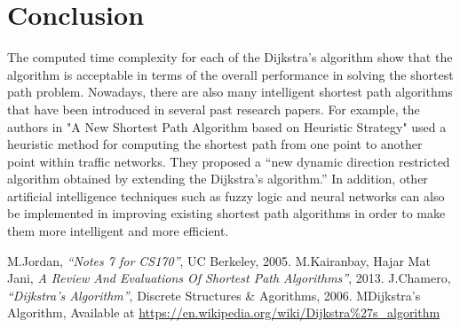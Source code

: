 \documentclass{article}
\begin{document}
\section{Conclusion}

The computed time complexity for each of the Dijkstra’s algorithm show that the algorithm is acceptable in terms of the overall performance in solving the shortest path problem. Nowadays, there are also many intelligent shortest path algorithms that have been introduced in several past research papers. For example, the authors in "A  New  Shortest Path Algorithm based on Heuristic Strategy" used a heuristic method for  computing the shortest path from one point to another point within traffic networks. They proposed a “new dynamic direction restricted algorithm obtained by extending the Dijkstra’s algorithm.” In addition, other artificial intelligence techniques such as fuzzy logic and neural networks can also be implemented in improving existing shortest path algorithms in order to make them more intelligent and more efficient.

\begin{thebibliography}{}

     M.Jordan, {\it “Notes 7 for CS170”}, UC Berkeley, 2005.
     M.Kairanbay, Hajar Mat Jani, {\it A Review And Evaluations Of Shortest Path Algorithms”}, 2013.
     J.Chamero, {\it “Dijkstra’s Algorithm”}, Discrete Structures \& Agorithms, 2006.
     MDijkstra’s Algorithm, Available at \url{https://en.wikipedia.org/wiki/Dijkstra%27s_algorithm} 
\end{thebibliography}
\end{document}
